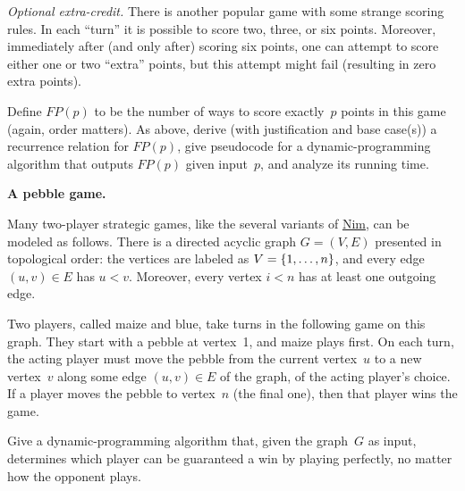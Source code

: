 \documentclass[11pt,addpoints]{exam}
\begin{document}
\begin{questions}
\begin{parts}
    \begin{solution}

    \end{solution}

    \bonuspart[3] \emph{Optional extra-credit.}
    There is another popular game with some strange scoring rules.
    In each ``turn'' it is possible to score two, three, or six points.
    Moreover, immediately after (and only after) scoring six points, one can attempt to score either one or two ``extra'' points, but this attempt might fail (resulting in zero extra points).

    Define $FP(p)$ to be the number of ways to score exactly~$p$ points in this game (again, order matters).
    As above, derive (with justification and base case(s)) a recurrence relation for $FP(p)$, give pseudocode for a dynamic-programming algorithm that outputs $FP(p)$ given input~$p$, and analyze its running time.
    \begin{solution}

    \end{solution}

  \end{parts}

  \question \textbf{A pebble game.}
    
  Many two-player strategic games, like the several variants of \href{https://en.wikipedia.org/wiki/Nim}{Nim}, can be modeled as follows.
  There is a directed acyclic graph $G=(V,E)$ presented in topological order: the vertices are labeled as $V=\{1, \ldots, n\}$, and every edge $(u,v) \in E$ has $u < v$.
  Moreover, every vertex $i < n$ has at least one outgoing edge.
    
  Two players, called maize and blue, take turns in the following game on this graph.
  They start with a pebble at vertex~1, and maize plays first.
  On each turn, the acting player must move the pebble from the current vertex~$u$ to a new vertex~$v$ along some edge $(u,v) \in E$ of the graph, of the acting player's choice.
  If a player moves the pebble to vertex~$n$ (the final one), then that player wins the game.

  Give a dynamic-programming algorithm that, given the graph~$G$ as input, determines which player can be guaranteed a win by playing perfectly, no matter how the opponent plays.
    
\end{questions}
\end{document}
